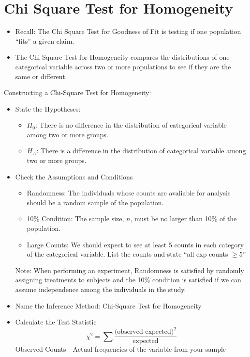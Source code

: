 \documentclass[../stats.tex]{subfiles}
\begin{document}
\section{Chi Square Test for Homogeneity}
\begin{itemize}
    \item Recall: The Chi Square Test for Goodness of Fit is testing if one population ``fits'' a given claim.
    \item The Chi Square Test for Homogeneity compares the distributions of one categorical variable across two or more populations to see if they are the same or different 
\end{itemize}

Constructing a Chi-Square Test for Homogeneity:
\begin{itemize}
    \item State the Hypotheses:
    \begin{itemize}
        \item $H_0$: There is no difference in the distribution of {categorical variable} among {two or more groups}.
        \item $H_A$: There is a difference in the distribution of {categorical variable} among {two or more groups}.
    \end{itemize}

    \item Check the Assumptions and Conditions
    \begin{itemize}
        \item Randomness: The individuals whose counts are avaliable for analysis should be a random sample of the population.
        \item 10\% Condition: The sample size, $n$, must be no larger than 10\% of the population.
        \item Large Counts: We should expect to see at least 5 counts in each category of the categorical variable. List the counts and state ``all exp counts $\geq 5$''
    \end{itemize}

    Note: When performing an experiment, Randomness is satisfied by randomly assigning treatments to subjects and the 10\% condition is satisfied if we can assume independence among the individuals in the study.

    \item Name the Inference Method: Chi-Square Test for Homogeneity
    \item Calculate the Test Statistic
    \[ \chi^2 = \sum \frac{\text{(observed-expected)}^2}{\text{expected}} \]
    Observed Counts - Actual frequencies of the variable from your sample 


\end{itemize}
\end{document}
